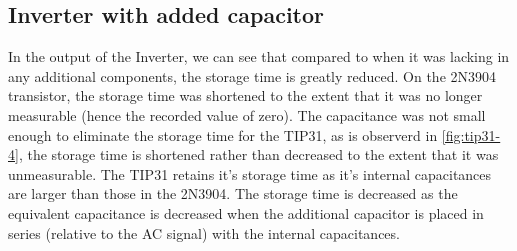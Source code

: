 \documentclass[10pt]{article}
\begin{document}
\subsection{Inverter with added capacitor}

In the output of the Inverter, we can see that compared to when it was
lacking in any additional components, the storage time is greatly reduced.
On the 2N3904 transistor, the storage time was shortened to the extent
that it was no longer measurable (hence the recorded value of zero). The
capacitance was not small enough to eliminate the storage time for the
TIP31, as is observerd in \autoref{fig:tip31-4}, the storage time is
shortened rather than decreased to the extent that it was unmeasurable.
The TIP31 retains it's storage time as it's internal capacitances are
larger than those in the 2N3904. The storage time is decreased as the
equivalent capacitance is decreased when the additional capacitor is
placed in series (relative to the AC signal) with the internal
capacitances.


%
\end{document}
